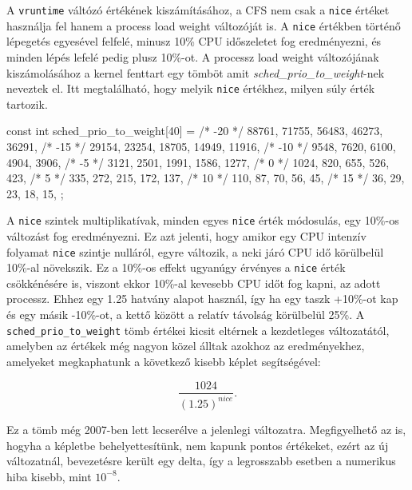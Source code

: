 A \texttt{vruntime} váltózó értékének kiszámításához, a CFS nem csak a \texttt{nice} értéket használja fel hanem a process load weight változóját is. A \texttt{nice} értékben történő lépegetés egyesével felfelé, minusz 10\% CPU időszeletet fog eredményezni, és minden lépés lefelé pedig plusz 10\%-ot. 
A processz load weight változójának kiszámolásához a kernel fenttart egy tömböt amit \textit{sched\_prio\_to\_weight}-nek neveztek el. Itt megtalálható, hogy melyik \texttt{nice} értékhez, milyen súly érték tartozik.
\begin{cpp}
const int sched_prio_to_weight[40] = {
 /* -20 */     88761,     71755,     56483,     46273,     36291,
 /* -15 */     29154,     23254,     18705,     14949,     11916,
 /* -10 */      9548,      7620,      6100,      4904,      3906,
 /*  -5 */      3121,      2501,      1991,      1586,      1277,
 /*   0 */      1024,       820,       655,       526,       423,
 /*   5 */       335,       272,       215,       172,       137,
 /*  10 */       110,        87,        70,        56,        45,
 /*  15 */        36,        29,        23,        18,        15,
};
\end{cpp}

A \texttt{nice} szintek multiplikatívak, minden egyes \texttt{nice} érték módosulás, egy 10\%-os változást fog eredményezni. Ez azt jelenti, hogy amikor egy CPU intenzív folyamat \texttt{nice} szintje nulláról, egyre változik, a neki járó CPU idő körülbelül 10\%-al növekszik.
Ez a 10\%-os effekt ugyanúgy érvényes a \texttt{nice} érték csökkénésére is, viszont ekkor 10\%-al kevesebb CPU időt fog kapni, az adott processz.
Ehhez egy 1.25 hatvány alapot használ, így ha egy taszk +10\%-ot kap és egy másik -10\%-ot, a kettő között a relatív távolság körülbelül 25\%.
A \texttt{sched\_prio\_to\_weight} tömb értékei kicsit eltérnek a kezdetleges változatától, amelyben az értékek még nagyon közel álltak azokhoz az eredményekhez, amelyeket megkaphatunk a következő kisebb képlet segítségével:

\begin{equation}
\frac{1024}{(1.25)^{nice}}.
\end{equation}

Ez a tömb még 2007-ben lett lecserélve a jelenlegi változatra. 
Megfigyelhető az is, hogyha a képletbe behelyettesítünk, nem kapunk pontos értékeket, ezért az új változatnál, bevezetésre került egy delta, így a legrosszabb esetben a numerikus hiba kisebb, mint $10^{-8}$.

